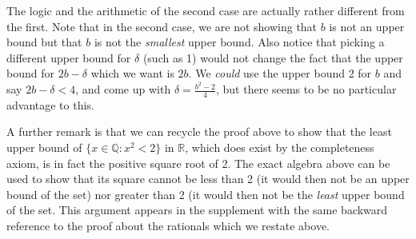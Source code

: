 \documentclass[12pt]{article}
\begin{document}
The logic and the arithmetic of the second case are actually rather different from the first.  Note that in the second case, we are not showing that $b$ is not an upper bound but that
$b$ is not the {\em smallest\/} upper bound.  Also notice that picking a different upper bound for $\delta$ (such as 1) would not change the fact that the upper bound for
$2b-\delta$ which we want is $2b$.  We {\em could\/} use the upper bound 2 for $b$ and say $2b-\delta<4$, and come up with $\delta = \frac{b^2-2}4$, but there seems to be no particular advantage to this.

A further remark is that we can recycle the proof above to show that the least upper bound of $\{x \in \mathbb Q:x^2<2\}$ in $\mathbb R$, which does exist by the completeness axiom, is in fact the positive square root of 2.  The exact algebra above can be used to show that its square cannot be less than 2 (it would then not be an upper bound of the set) nor greater than 2 (it would then not be the {\em least\/} upper bound of the set.  This argument appears in the supplement with the same backward reference to the proof about the rationals which we restate above.
\end{document}
